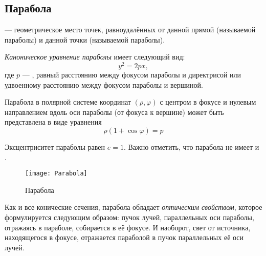 \subsection{Парабола}

{\bfseries {}} --- геометрическое место точек, равноудалённых от данной прямой (называемой  параболы) и данной точки (называемой  параболы).

{\itshape Каноническое уравнение параболы} имеет следующий вид:
\begin{equation}
y^2=2px,
\end{equation}
где $p$ --- , равный расстоянию между фокусом параболы и директрисой или удвоенному расстоянию между фокусом параболы и вершиной.

Парабола в полярной системе координат $(\rho,\varphi)$ с центром в фокусе и нулевым направлением вдоль оси параболы (от фокуса к вершине) может быть представлена в виде уравнения
\begin{equation}
\rho(1+\cos\varphi)=p
\end{equation}

Эксцентриситет параболы равен $e=1$.
Важно отметить, что парабола не имеет  и .

\begin{figure}[h!]
\centering
\texttt{[image: Parabola]}
\caption{Парабола \label{pic:the-pic}}
\end{figure}

Как и все конические сечения, парабола обладает \textit{оптическим свойством}, которое формулируется следующим образом: пучок лучей, параллельных оси параболы, отражаясь в параболе, собирается в её фокусе. И наоборот, свет от источника, находящегося в фокусе, отражается параболой в пучок параллельных её оси лучей.

